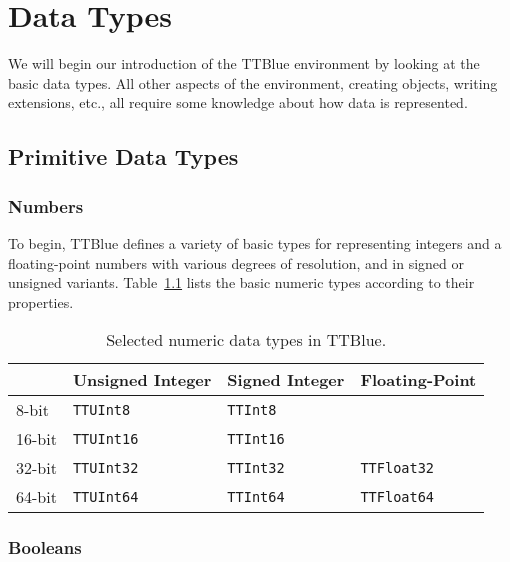 \chapter{Data Types}


We will begin our introduction of the TTBlue environment by looking at the basic data types.  All other aspects of the environment, creating objects, writing extensions, etc., all require some knowledge about how data is represented.



\section{Primitive Data Types}

\subsection{Numbers}
To begin, TTBlue defines a variety of basic types for representing integers and a floating-point numbers with various degrees of resolution, and in signed or unsigned variants.  Table~\ref{tab:numeric_types} lists the basic numeric types according to their properties.

\begin{table}[ht]
\begin{center}
\footnotesize\noindent
\begin{tabular}{| l | l | l | l |}
    \hline
    \textbf{}	&	\textbf{Unsigned Integer}      & \textbf{Signed Integer}	& \textbf{Floating-Point}	\\ 
	\hline
	8-bit	&	\texttt{TTUInt8}			& \texttt{TTInt8}	 	&			\\
	\hline
	16-bit	&  \texttt{TTUInt16} & \texttt{TTInt16}		&		 \\
	\hline
	32-bit		& \texttt{TTUInt32}		&	\texttt{TTInt32}		&	\texttt{TTFloat32}	 \\
	\hline
	64-bit		& \texttt{TTUInt64}		&	\texttt{TTInt64}		&	\texttt{TTFloat64}	 \\
	\hline
\end{tabular}
\end{center}
\caption{Selected numeric data types in TTBlue.}
\label{tab:numeric_types}
\end{table}




\subsection{Booleans}

